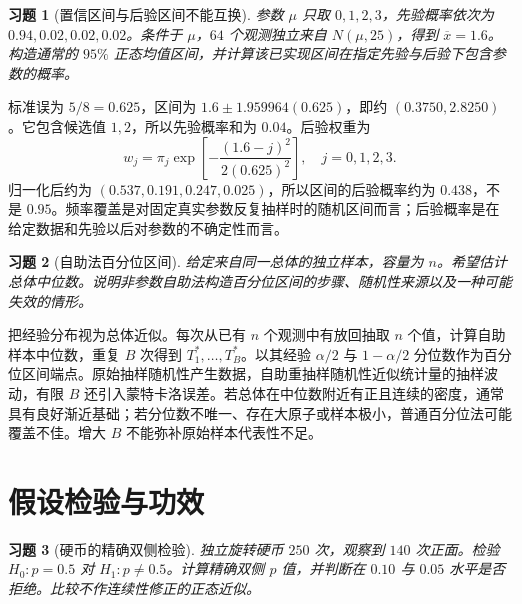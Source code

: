 \documentclass[UTF8,12pt,a4paper,fontset=fandol]{ctexart}
\newtheorem{exercise}{习题}[section]
\begin{document}
\begin{exercise}[置信区间与后验区间不能互换]\label{q:M-P10-5}
参数 $\mu$ 只取 $0,1,2,3$，先验概率依次为 $0.94,0.02,0.02,0.02$。条件于 $\mu$，$64$ 个观测独立来自 $N(\mu,25)$，得到 $\overline x=1.6$。构造通常的 $95\%$ 正态均值区间，并计算该已实现区间在指定先验与后验下包含参数的概率。\par{}
\end{exercise}

\begin{solve}\label{a:M-P10-5}标准误为 $5/8=0.625$，区间为 $1.6\pm1.959964(0.625)$，即约 $(0.3750,2.8250)$。它包含候选值 $1,2$，所以先验概率和为 $0.04$。后验权重为\[w_j=\pi_j\exp\left[-\frac{(1.6-j)^2}{2(0.625)^2}\right],\quad j=0,1,2,3.\]归一化后约为 $(0.537,0.191,0.247,0.025)$，所以区间的后验概率约为 $0.438$，不是 $0.95$。频率覆盖是对固定真实参数反复抽样时的随机区间而言；后验概率是在给定数据和先验以后对参数的不确定性而言。\end{solve}

\begin{exercise}[自助法百分位区间]\label{q:B13.6}
给定来自同一总体的独立样本，容量为 $n$。希望估计总体中位数。说明非参数自助法构造百分位区间的步骤、随机性来源以及一种可能失效的情形。\par{}
\end{exercise}

\begin{solve}\label{a:B13.6}把经验分布视为总体近似。每次从已有 $n$ 个观测中有放回抽取 $n$ 个值，计算自助样本中位数，重复 $B$ 次得到 $T_1^*,\ldots,T_B^*$。以其经验 $\alpha/2$ 与 $1-\alpha/2$ 分位数作为百分位区间端点。原始抽样随机性产生数据，自助重抽样随机性近似统计量的抽样波动，有限 $B$ 还引入蒙特卡洛误差。若总体在中位数附近有正且连续的密度，通常具有良好渐近基础；若分位数不唯一、存在大原子或样本极小，普通百分位法可能覆盖不佳。增大 $B$ 不能弥补原始样本代表性不足。\end{solve}

\clearpage\section{假设检验与功效}

\begin{exercise}[硬币的精确双侧检验]\label{q:M-P8-1ab}
独立旋转硬币 $250$ 次，观察到 $140$ 次正面。检验 $H_0:p=0.5$ 对 $H_1:p\ne0.5$。计算精确双侧 $p$ 值，并判断在 $0.10$ 与 $0.05$ 水平是否拒绝。比较不作连续性修正的正态近似。\par{}
\end{exercise}
\end{document}
